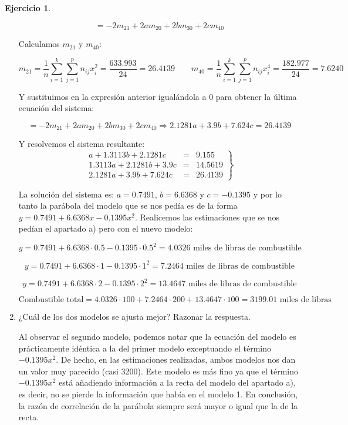 \documentclass[a4paper, 12pt]{article}
\theoremstyle{definition}
\newtheorem{ej}{Ejercicio}
\begin{document}
\begin{ej}
\begin{enumerate}[label=\alph*)]
\[
   = -2m_{21}+2am_{20}+2bm_{30}+2cm_{40}
\]

Calculamos $m_{21}$ y $m_{40}$:

\[
    m_{21} = \frac{1}{n}\sum_{i=1}^{k}\sum_{j=1}^{p}n_{ij}x_{i}^{2} = \frac{633.993}{24} = 26.4139 \qquad m_{40} = \frac{1}{n}\sum_{i=1}^{k}\sum_{j=1}^{p}n_{ij}x_{i}^{4} = \frac{182.977}{24} = 7.6240
\]

Y sustituimos en la expresión anterior igualándola a 0 para obtener la última ecuación del sistema:

\[
    = -2m_{21}+2am_{20}+2bm_{30}+2cm_{40} \Rightarrow 2.1281a+3.9b+7.624c = 26.4139
\]

Y resolvemos el sistema resultante:
\[
\left.
\begin{array}{rcl}
     a+1.3113b+2.1281c&=&9.155
  \\ 1.3113a+2.1281b+3.9c&=&14.5619
  \\ 2.1281a+3.9b+7.624c &=& 26.4139
\end{array}
\right\}
\]

La solución del sistema es: $a=0.7491$, $b=6.6368$ y $c=-0.1395$ y por lo tanto la parábola del modelo que se nos pedía es de la forma $y=0.7491+6.6368x-0.1395x^2$. Realicemos las estimaciones que se nos pedían el apartado a) pero con el nuevo modelo:

\[
    y = 0.7491+6.6368 \cdot 0.5 -0.1395 \cdot 0.5^2 = 4.0326 \text{ miles de libras de combustible}
\]

\[
    y = 0.7491+6.6368 \cdot 1 -0.1395 \cdot 1^2 =  7.2464\text{ miles de libras de combustible}
\]

\[
    y = 0.7491+6.6368 \cdot 2 -0.1395 \cdot 2^2 =  13.4647 \text{ miles de libras de combustible}
\]

\[
    \text{Combustible total} = 4.0326 \cdot 100 + 7.2464 \cdot 200 + 13.4647 \cdot 100 = 3199.01 \text{ miles de libras}
\]

\newpage

\item ¿Cuál de los dos modelos se ajusta mejor? Razonar la respuesta.

Al observar el segundo modelo, podemos notar que la ecuación del modelo es prácticamente idéntica a la del primer modelo exceptuando el término $-0.1395x^2$. De hecho, en las estimaciones realizadas, ambos modelos nos dan un valor muy parecido (casi 3200). Este modelo es más fino ya que el término $-0.1395x^2$ está añadiendo información a la recta del modelo del apartado a), es decir, no se pierde la información que había en el modelo 1. En conclusión, la razón de correlación de la parábola siempre será mayor o igual que la de la recta.

\end{enumerate}
\end{ej}
\end{document}
